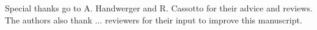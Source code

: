 \documentclass[journal abbreviation, manuscript]{copernicus}
\begin{document}


\begin{acknowledgements}
Special thanks go to A. Handwerger and R. Cassotto for their advice and reviews. The authors also thank ... reviewers for their input to improve this manuscript. 
\end{acknowledgements}



















\end{document}
